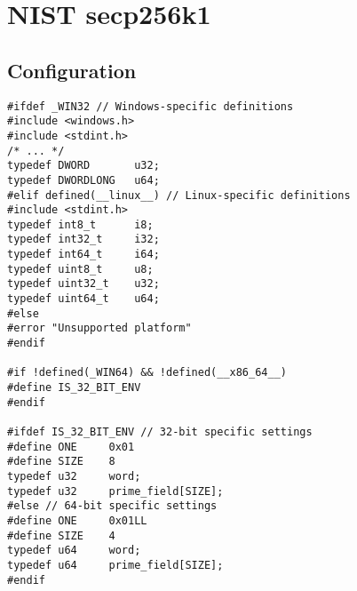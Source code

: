 \chapter{NIST secp256k1}
\iffalse
\section{Time Measure in Linux}

\begin{lstlisting}[style=C]
#define _POSIX_C_SOURCE 200809L
#include <time.h>

typedef int8_t i8;
typedef int32_t i32;
typedef int64_t i64;

typedef uint8_t u8;
typedef uint32_t u32;
typedef uint64_t u64;

inline u64 rdtsc(void) {
	u32 lo, hi;
	
	__asm__ __volatile__ (
	"rdtsc" : "=a" (lo), "=d" (hi)
	);
	
	return ((u64)hi << 32) | lo;
}

u64 measure_cycle(void (*func)(u8*, u8*), u8* para1, u8* para2) {
	u64 start, end;
	const u64 num_runs = 10000;
	
	func(para1, para2);
	start = rdtsc();
	for (i32 i = 0; i < num_runs; i++)
		func(para1, para2);
	end = rdtsc();
	
	return (end - start) / num_runs;
}

double measure_time(void (*func)(u8*, u8*), u8* para1, u8* para2) {
	struct timespec start, end;
	double cpu_time_used;
	const double num_runs = 10000;
	
	func(para1, para2);
	clock_gettime(CLOCK_MONOTONIC, &start);
	for (i32 i = 0; i < num_runs; i++)
		func(para1, para2);
	clock_gettime(CLOCK_MONOTONIC, &end);
	
	cpu_time_used =
		(end.tv_sec - start.tv_sec) +
		(end.tv_nsec - start.tv_nsec) / 1e9;
	
	return cpu_time_used / num_runs;
}
\end{lstlisting}
\fi

\section*{Configuration}
\begin{lstlisting}[style=C]
#ifdef _WIN32 // Windows-specific definitions
#include <windows.h>
#include <stdint.h>
/* ... */
typedef DWORD       u32;
typedef DWORDLONG   u64;
#elif defined(__linux__) // Linux-specific definitions
#include <stdint.h>
typedef int8_t      i8;
typedef int32_t     i32;
typedef int64_t     i64;
typedef uint8_t     u8;
typedef uint32_t    u32;
typedef uint64_t    u64;
#else
#error "Unsupported platform"
#endif

#if !defined(_WIN64) && !defined(__x86_64__)
#define IS_32_BIT_ENV
#endif

#ifdef IS_32_BIT_ENV // 32-bit specific settings
#define ONE     0x01
#define SIZE    8
typedef u32     word;
typedef u32     prime_field[SIZE];
#else // 64-bit specific settings
#define ONE     0x01LL
#define SIZE    4
typedef u64     word;
typedef u64     prime_field[SIZE];
#endif
\end{lstlisting}


